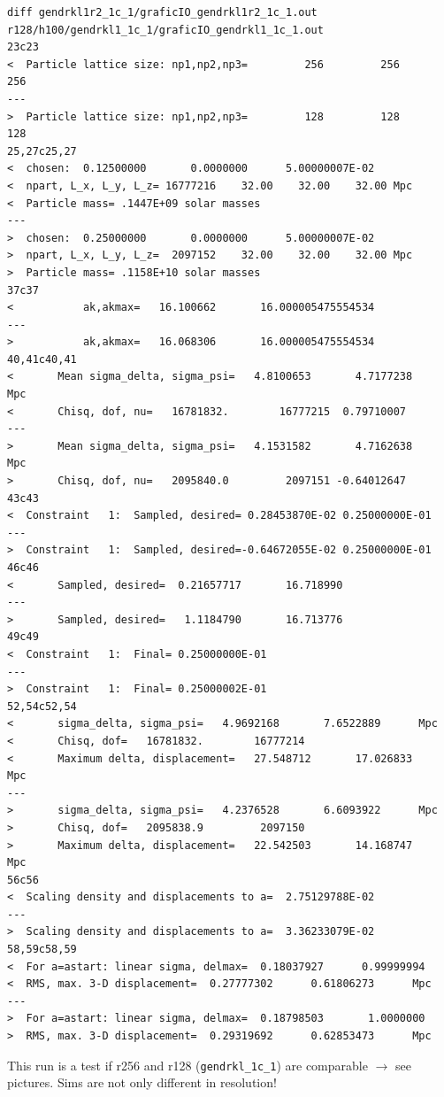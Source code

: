 \begin{verbatim}
diff gendrkl1r2_1c_1/graficIO_gendrkl1r2_1c_1.out r128/h100/gendrkl1_1c_1/graficIO_gendrkl1_1c_1.out 
23c23
<  Particle lattice size: np1,np2,np3=         256         256         256
---
>  Particle lattice size: np1,np2,np3=         128         128         128
25,27c25,27
<  chosen:  0.12500000       0.0000000      5.00000007E-02
<  npart, L_x, L_y, L_z= 16777216    32.00    32.00    32.00 Mpc
<  Particle mass= .1447E+09 solar masses
---
>  chosen:  0.25000000       0.0000000      5.00000007E-02
>  npart, L_x, L_y, L_z=  2097152    32.00    32.00    32.00 Mpc
>  Particle mass= .1158E+10 solar masses
37c37
<           ak,akmax=   16.100662       16.000005475554534     
---
>           ak,akmax=   16.068306       16.000005475554534     
40,41c40,41
<       Mean sigma_delta, sigma_psi=   4.8100653       4.7177238      Mpc
<       Chisq, dof, nu=   16781832.        16777215  0.79710007    
---
>       Mean sigma_delta, sigma_psi=   4.1531582       4.7162638      Mpc
>       Chisq, dof, nu=   2095840.0         2097151 -0.64012647    
43c43
<  Constraint   1:  Sampled, desired= 0.28453870E-02 0.25000000E-01
---
>  Constraint   1:  Sampled, desired=-0.64672055E-02 0.25000000E-01
46c46
<       Sampled, desired=  0.21657717       16.718990    
---
>       Sampled, desired=   1.1184790       16.713776    
49c49
<  Constraint   1:  Final= 0.25000000E-01
---
>  Constraint   1:  Final= 0.25000002E-01
52,54c52,54
<       sigma_delta, sigma_psi=   4.9692168       7.6522889      Mpc
<       Chisq, dof=   16781832.        16777214
<       Maximum delta, displacement=   27.548712       17.026833      Mpc
---
>       sigma_delta, sigma_psi=   4.2376528       6.6093922      Mpc
>       Chisq, dof=   2095838.9         2097150
>       Maximum delta, displacement=   22.542503       14.168747      Mpc
56c56
<  Scaling density and displacements to a=  2.75129788E-02
---
>  Scaling density and displacements to a=  3.36233079E-02
58,59c58,59
<  For a=astart: linear sigma, delmax=  0.18037927      0.99999994    
<  RMS, max. 3-D displacement=  0.27777302      0.61806273      Mpc
---
>  For a=astart: linear sigma, delmax=  0.18798503       1.0000000    
>  RMS, max. 3-D displacement=  0.29319692      0.62853473      Mpc

\end{verbatim}

This run is a test if r256 and r128 (\texttt{gendrkl\_1c\_1}) are comparable $\rightarrow$ see pictures. Sims are not only different in resolution! 

